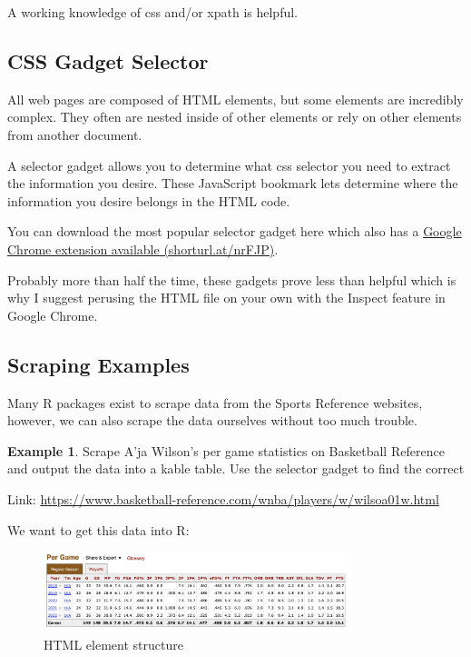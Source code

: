 \documentclass[
  11pt,
]{book}
\theoremstyle{definition}
\theoremstyle{definition}
\newtheorem{example}{Example}[chapter]
\theoremstyle{definition}
\theoremstyle{definition}
\theoremstyle{remark}
\begin{document}
A working knowledge of css and/or xpath is helpful.

\hypertarget{css-gadget-selector}{%
\subsection{CSS Gadget Selector}\label{css-gadget-selector}}

All web pages are composed of HTML elements, but some elements are incredibly complex. They often are
nested inside of other elements or rely on other elements from another document.

A selector gadget allows you to determine what css selector you need to extract the information you desire. These JavaScript bookmark lets determine where the information you desire belongs in the HTML code.

You can download the most popular selector gadget here which also has a \href{https://chrome.google.com/webstore/detail/selectorgadget/mhjhnkcfbdhnjickkkdbjoemdmbfginb?hl=en}{Google Chrome extension available (shorturl.at/nrFJP)}.

Probably more than half the time, these gadgets prove less than helpful which is why I suggest perusing the HTML file on your own with the Inspect feature in Google Chrome.

\newpage

\hypertarget{scraping-examples}{%
\subsection{Scraping Examples}\label{scraping-examples}}

Many R packages exist to scrape data from the Sports Reference websites, however, we can also scrape the data ourselves without too much trouble.

\begin{example}
Scrape A'ja Wilson's per game statistics on Basketball Reference and output the data into a kable table. Use the selector gadget to find the correct

Link: \url{https://www.basketball-reference.com/wnba/players/w/wilsoa01w.html}
\end{example}

We want to get this data into R:

\begin{figure}
\centering
\includegraphics[width=0.8\textwidth,height=\textheight]{images/wilson-scrape.png}
\caption{HTML element structure}
\end{figure}
\end{document}
